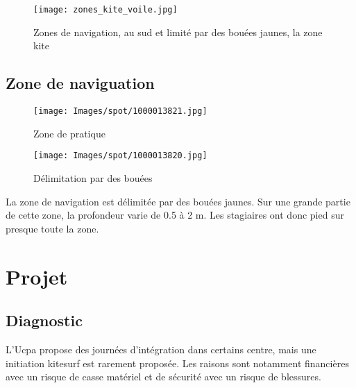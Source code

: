 \documentclass[12pt,a4paper]{report}
\begin{document}
\begin{figure}
\texttt{[image: zones\_kite\_voile.jpg]} 
\caption{Zones de navigation, au sud et limité par des bouées jaunes,
 la zone kite\label{zones_nav}}
\end{figure}

\subsection{Zone de naviguation}
\begin{figure}
\begin{minipage}{0.4\textwidth}
\texttt{[image: Images/spot/1000013821.jpg]} 
\caption{Zone de pratique}
\end{minipage}
\hfill
\begin{minipage}{0.4\textwidth}
\texttt{[image: Images/spot/1000013820.jpg]} 
\caption{Délimitation par des bouées}
\end{minipage}
\end{figure}
La zone de navigation est délimitée par des bouées jaunes.
Sur une grande partie de cette zone, la profondeur varie de 0.5 à 2 m.
Les stagiaires ont donc pied sur presque toute la zone.
\section{Projet}
\subsection{Diagnostic}

L'Ucpa propose des journées d'intégration dans certains centre, mais
une initiation kitesurf est rarement proposée. Les raisons sont notamment
financières avec un risque de casse matériel
et de sécurité avec un risque de blessures.
\end{document}
